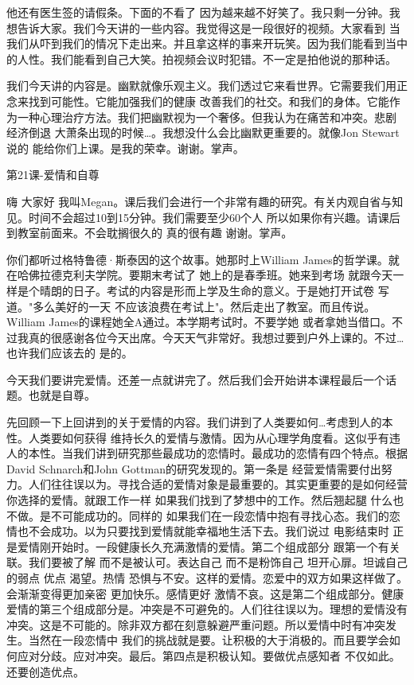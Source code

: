 他还有医生签的请假条。下面的不看了 因为越来越不好笑了。我只剩一分钟。我想告诉大家。我们今天讲的一些内容。我觉得这是一段很好的视频。大家看到 当我们从吓到我们的情况下走出来。并且拿这样的事来开玩笑。因为我们能看到当中的人性。我们能看到自己大笑。拍视频会议时犯错。不一定是拍他说的那种话。 

我们今天讲的内容是。幽默就像乐观主义。我们透过它来看世界。它需要我们用正念来找到可能性。它能加强我们的健康 改善我们的社交。和我们的身体。它能作为一种心理治疗方法。我们把幽默视为一个奢侈。但我认为在痛苦和冲突。悲剧 经济倒退 大萧条出现的时候…。我想没什么会比幽默更重要的。就像Jon Stewart说的 能给你们上课。是我的荣幸。谢谢。掌声。 

第21课-爱情和自尊 

嗨 大家好 我叫Megan。课后我们会进行一个非常有趣的研究。有关内观自省与知见。时间不会超过10到15分钟。我们需要至少60个人 所以如果你有兴趣。请课后到教室前面来。不会耽搁很久的 真的很有趣 谢谢。掌声。 

你们都听过格特鲁德·斯泰因的这个故事。她那时上William James的哲学课。就在哈佛拉德克利夫学院。要期末考试了 她上的是春季班。她来到考场 就跟今天一样是个晴朗的日子。考试的内容是形而上学及生命的意义。于是她打开试卷 写道。"多么美好的一天 不应该浪费在考试上"。然后走出了教室。而且传说。William James的课程她全A通过。本学期考试时。不要学她 或者拿她当借口。不过我真的很感谢各位今天出席。今天天气非常好。我想过要到户外上课的。不过…也许我们应该去的 是的。 

今天我们要讲完爱情。还差一点就讲完了。然后我们会开始讲本课程最后一个话题。也就是自尊。 

先回顾一下上回讲到的关于爱情的内容。我们讲到了人类要如何…考虑到人的本性。人类要如何获得 维持长久的爱情与激情。因为从心理学角度看。这似乎有违人的本性。当我们讲到研究那些最成功的恋情时。最成功的恋情有四个特点。根据David Schnarch和John Gottman的研究发现的。第一条是 经营爱情需要付出努力。人们往往误以为。寻找合适的爱情对象是最重要的。其实更重要的是如何经营你选择的爱情。就跟工作一样 如果我们找到了梦想中的工作。然后翘起腿 什么也不做。是不可能成功的。同样的 如果我们在一段恋情中抱有寻找心态。我们的恋情也不会成功。以为只要找到爱情就能幸福地生活下去。我们说过 电影结束时 正是爱情刚开始时。一段健康长久充满激情的爱情。第二个组成部分 跟第一个有关联。我们要被了解 而不是被认可。表达自己 而不是粉饰自己 坦开心扉。坦诚自己的弱点 优点 渴望。热情 恐惧与不安。这样的爱情。恋爱中的双方如果这样做了。会渐渐变得更加亲密 更加快乐。感情更好 激情不哀。这是第二个组成部分。健康爱情的第三个组成部分是。冲突是不可避免的。人们往往误以为。理想的爱情没有冲突。这是不可能的。除非双方都在刻意躲避严重问题。所以爱情中时有冲突发生。当然在一段恋情中 我们的挑战就是要。让积极的大于消极的。而且要学会如何应对分歧。应对冲突。最后。第四点是积极认知。要做优点感知者 不仅如此。还要创造优点。 

